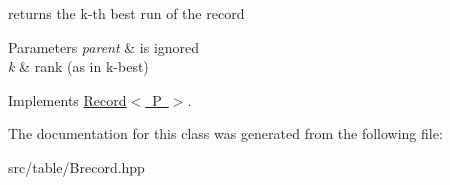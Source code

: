 returns the k-\/th best run of the record 


\begin{DoxyParams}{Parameters}
{\em parent} & is ignored \\
\hline
{\em k} & rank (as in k-\/best) \\
\hline
\end{DoxyParams}


Implements \mbox{\hyperlink{classRecord_a767aeb8c69e0866328fc82e066af7c3b}{Record$<$ P $>$}}.



The documentation for this class was generated from the following file\+:\begin{DoxyCompactItemize}
\item 
src/table/Brecord.\+hpp\end{DoxyCompactItemize}
